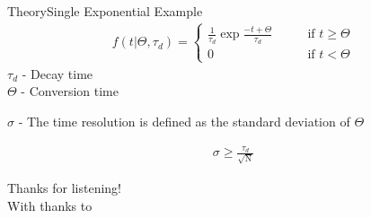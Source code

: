 \documentclass[12pt,xetex,mathserif,serif]{beamer}
\begin{document}
\begin{frame}{Theory}{Single Exponential Example} 
\begin{align*}
f(t|\Theta,\tau_d)=\begin{cases} \frac{1}{\tau_d}\exp{\frac{-t+\Theta}{\tau_d}} &\qquad\mbox{if } t \geq\Theta \\
0 &\qquad \mbox{if } t < \Theta \end{cases}
\end{align*}
$\tau_d$ - Decay time\\
$\Theta$ - Conversion time 

\begin{center}$\sigma$ - The time resolution is defined as the standard deviation of $\Theta$\end{center}
\begin{align*}
\boxed{\sigma \geq \frac{\tau_d}{\sqrt{\operatorname{N}}}}
\end{align*}
\end{frame}

\begin{frame}
	\begin{center}
    \vspace{2cm}
    {\Large Thanks for listening!}\\
     \vspace{2cm}
    {With thanks to}\\
	\end{center}
\end{frame}
\end{document}
